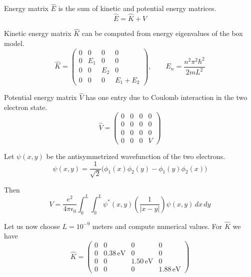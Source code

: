 \documentclass[12pt]{article}
\begin{document}
\noindent
Energy matrix $\hat{E}$ is the sum of kinetic and potential energy matrices.
\begin{equation*}
\hat{E}=\hat{K}+\hat{V}
\end{equation*}

\noindent
Kinetic energy matrix $\hat{K}$ can be computed from energy eigenvalues of the box model.
\begin{equation*}
\hat{K}=\begin{pmatrix}
0 & 0 & 0 & 0\\
0 & E_1 & 0 & 0\\
0 & 0 & E_2 & 0\\
0 & 0 & 0 & E_1+E_2
\end{pmatrix},
\qquad
E_n=\frac{n^2\pi^2\hbar^2}{2mL^2}
\end{equation*}

\noindent
Potential energy matrix $\hat{V}$ has one entry due to Coulomb interaction in the two electron state.
\begin{equation*}
\hat{V}=
\begin{pmatrix}
0 & 0 & 0 & 0\\
0 & 0 & 0 & 0\\
0 & 0 & 0 & 0\\
0 & 0 & 0 & V
\end{pmatrix}
\end{equation*}

\noindent
Let $\psi(x,y)$ be the antisymmetrized wavefunction of the two electrons.
\begin{equation*}
\psi(x,y)=\frac{1}{\sqrt{2}}\big(\phi_1(x)\phi_2(y)-\phi_1(y)\phi_2(x)\big)
\end{equation*}

\noindent
Then
\begin{equation*}
V=\frac{e^2}{4\pi\epsilon_0}\int_0^L\int_0^L
\psi^*(x,y)\left(\frac{1}{|x-y|}\right)\psi(x,y)\,dx\,dy
\end{equation*}

\noindent
Let us now choose $L=10^{-9}$ meters and compute numerical values.
For $\hat{K}$ we have
\begin{equation*}
\hat{K}=\begin{pmatrix}
0 & 0 & 0 & 0\\
0 & 0.38\,\text{eV} & 0 & 0\\
0 & 0 & 1.50\,\text{eV} & 0\\
0 & 0 & 0 & 1.88\,\text{eV}
\end{pmatrix}
\end{equation*}
\end{document}
